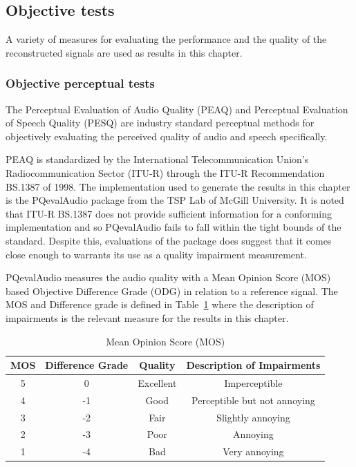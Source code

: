 \subsection{Objective tests}
A variety of measures for evaluating the performance and the quality of the reconstructed signals are used as results in this chapter. 
\subsubsection{Objective perceptual tests}
The Perceptual Evaluation of Audio Quality (PEAQ) and Perceptual Evaluation of Speech Quality (PESQ) are industry standard perceptual methods for objectively evaluating the perceived quality of audio and speech specifically.

PEAQ is standardized by the International Telecommunication Union's Radiocommunication Sector (ITU-R) through the ITU-R Recommendation BS.1387\cite{BS-1387-1998} of 1998. The implementation used to generate the results in this chapter is the PQevalAudio package from the TSP Lab of McGill University\cite{Kabal2003}. It is noted that ITU-R BS.1387 does not provide sufficient information for a conforming implementation\cite{Campeanu2005} and so PQevalAudio fails to fall within the tight bounds of the standard. Despite this, evaluations of the package does suggest that it comes close enough to warrants its use as a quality impairment measurement\cite{Kabal2003}.

PQevalAudio measures the audio quality with a Mean Opinion Score (MOS) based Objective Difference Grade (ODG) in relation to a reference signal. The MOS\cite{P-800-1996} and Difference grade\cite{Kabal2003} is defined in Table~\ref{tab:MOS} where the description of impairments is the relevant measure for the results in this chapter.

\begin{table}\begin{center}
\caption{Mean Opinion Score (MOS)}
\label{tab:MOS}
\begin{tabular}{|c|c|c|c|}\hline
MOS & Difference Grade  & Quality       & Description of Impairments  \\ \hline
5   & 0                 & Excellent     & Imperceptible               \\
4   & -1                & Good          & Perceptible but not annoying\\
3   & -2                & Fair          & Slightly annoying           \\
2   & -3                & Poor          & Annoying                    \\
1   & -4                & Bad           & Very annoying               \\ \hline
\end{tabular}\end{center}\end{table}

